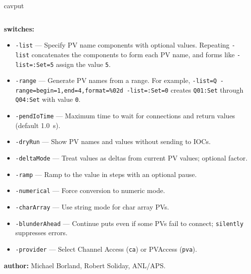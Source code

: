 \begin{sddsprog}{cavput}
\begin{verbatim}
\end{verbatim}
\item \textbf{switches:}
\begin{itemize}
  \item {\tt -list} --- Specify PV name components with optional values. Repeating
    \verb+-list+ concatenates the components to form each PV name, and
    forms like \verb+-list=:Set=5+ assign the value \verb+5+.
  \item {\tt -range} --- Generate PV names from a range. \newline
    For example, \verb+-list=Q -range=begin=1,end=4,format=%02d -list=:Set=0+ \newline
    creates \verb+Q01:Set+ through \verb+Q04:Set+ with value \verb+0+.
  \item {\tt -pendIoTime} --- Maximum time to wait for connections and return values (default 1.0~s).
  \item {\tt -dryRun} --- Show PV names and values without sending to IOCs.
  \item {\tt -deltaMode} --- Treat values as deltas from current PV values; optional factor.
  \item {\tt -ramp} --- Ramp to the value in steps with an optional pause.
  \item {\tt -numerical} --- Force conversion to numeric mode.
  \item {\tt -charArray} --- Use string mode for char array PVs.
  \item {\tt -blunderAhead} --- Continue puts even if some PVs fail to connect; \verb|silently| suppresses errors.
  \item {\tt -provider} --- Select Channel Access ({\tt ca}) or PVAccess ({\tt pva}).
\end{itemize}
\item \textbf{author:} Michael Borland, Robert Soliday, ANL/APS.
\end{sddsprog}
